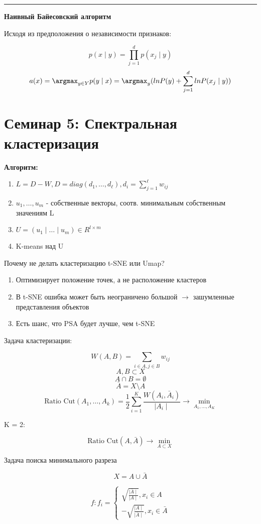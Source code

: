 \documentclass[a4paper, 12pt]{article}
\begin{document}
\rule{\linewidth}{0.5pt}

\textbf{Наивный Байесовский алгоритм}

Исходя из предположения о независимости признаков:

\[p(x \mid y) = \prod_{j = 1}^{d}p(x_j \mid y)\]
\[a(x) = \argmax_{y \in Y}p(y \mid x) = 
\argmax_{y}(lnP(y) + \sum_{j = 1}^d lnP(x_j \mid y))\]

\section{Семинар 5: Спектральная кластеризация}

\textbf{Алгоритм:}

\begin{enumerate}
    \item $L = D - W, 
    D = diag(d_1, \ldots, d_{\ell}), 
    d_i = \sum_{j = 1}^{\ell}w_{ij}$
    \item $u_1, \ldots, u_m$ - собственные векторы, соотв.
    минимальным собственным значениям L
    \item $U = (u_1 \mid \ldots \mid u_m) \in R^{l \times m}$
    \item K-means над U
\end{enumerate}

Почему не делать кластеризацию t-SNE или Umap?

\begin{enumerate}
    \item Оптимизирует положение точек, 
    а не расположение кластеров
    \item В t-SNE ошибка может быть неограничено большой
    $\rightarrow$ зашумленные представления объектов
    \item Есть шанс, что PSA будет лучше, чем t-SNE
\end{enumerate}

Задача кластеризации:

\[W(A, B) = \sum_{i \in A, j \in B}w_{ij}\]
\[A, B \subset X\]
\[A \cap B = \emptyset\]
\[\bar{A} = X \setminus A\]
\[\textrm{Ratio Cut}(A_1, \ldots, A_k) = 
\frac{1}{2} \sum_{i = 1}^K 
\frac{W(A_i, \bar{A}_i)}{\mid A_i \mid}
\rightarrow \min_{A_1, \ldots, A_K}\]

K = 2:

\[\textrm{Ratio Cut}(A, \bar{A}) 
\rightarrow \min_{A \subset X}\]

Задача поиска минимального разреза

\[X = A \cup \bar{A}\]

\[f: f_i =
\begin{cases}
    \sqrt{\frac{\mid\bar{A}\mid}{\mid A \mid}}, x_i \in A \\
    -\sqrt{\frac{\mid A\mid}{\mid \bar{A} \mid}}, x_i \in \bar{A}
\end{cases}\]
\end{document}
